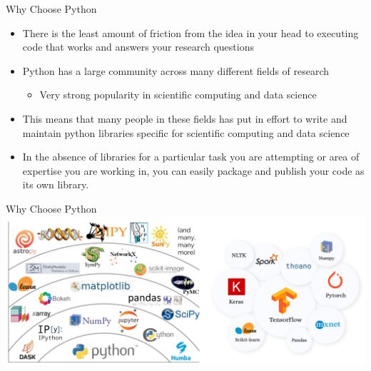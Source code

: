 \documentclass[aspectratio=169]{beamer}
\begin{document}
\begin{frame}{Why Choose Python}
    \begin{itemize}
        \item There is the least amount of friction from the idea in your head to executing code that works and answers your research questions
        \item Python has a large community across many different fields of research
              \begin{itemize}
                  \item Very strong popularity in scientific computing and data science
              \end{itemize}
        \item This means that many people in these fields has put in effort to write and maintain python libraries specific for scientific computing and data science
        \item In the absence of libraries for a particular task you are attempting or area of expertise you are working in, you can easily package and publish your code as its own library.
    \end{itemize}
\end{frame}

\begin{frame}{Why Choose Python}
    \centering
    \includegraphics[width=\textwidth]{imgs/python_packages_examples.png}
\end{frame}
\end{document}
